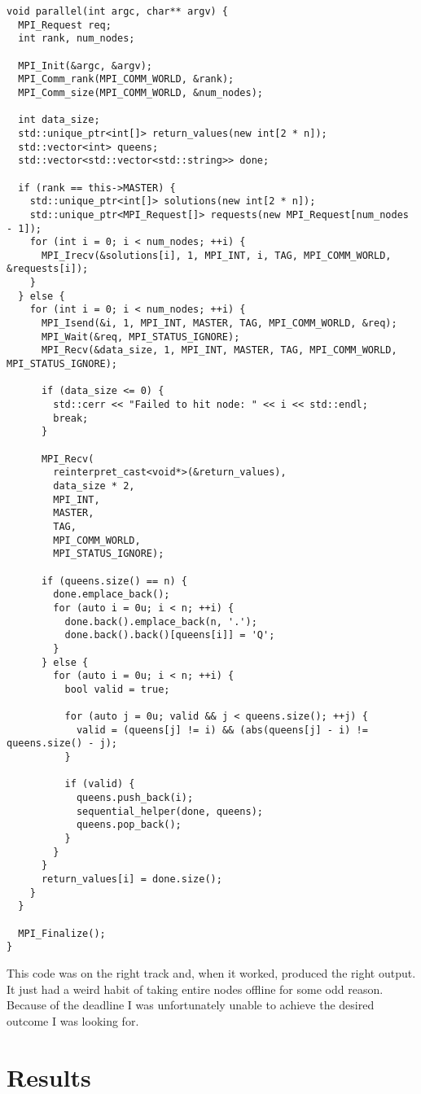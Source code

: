 \documentclass[11pt]{article}
\begin{document}
\lstset{frame=tb,language=c++}
\begin{lstlisting}
void parallel(int argc, char** argv) {
  MPI_Request req;
  int rank, num_nodes;

  MPI_Init(&argc, &argv);
  MPI_Comm_rank(MPI_COMM_WORLD, &rank);
  MPI_Comm_size(MPI_COMM_WORLD, &num_nodes);

  int data_size;
  std::unique_ptr<int[]> return_values(new int[2 * n]);
  std::vector<int> queens;
  std::vector<std::vector<std::string>> done;

  if (rank == this->MASTER) {
    std::unique_ptr<int[]> solutions(new int[2 * n]);
    std::unique_ptr<MPI_Request[]> requests(new MPI_Request[num_nodes - 1]);
    for (int i = 0; i < num_nodes; ++i) {
      MPI_Irecv(&solutions[i], 1, MPI_INT, i, TAG, MPI_COMM_WORLD, &requests[i]);
    }
  } else {
    for (int i = 0; i < num_nodes; ++i) {
      MPI_Isend(&i, 1, MPI_INT, MASTER, TAG, MPI_COMM_WORLD, &req);
      MPI_Wait(&req, MPI_STATUS_IGNORE);
      MPI_Recv(&data_size, 1, MPI_INT, MASTER, TAG, MPI_COMM_WORLD, MPI_STATUS_IGNORE);

      if (data_size <= 0) {
        std::cerr << "Failed to hit node: " << i << std::endl;
        break;
      }

      MPI_Recv(
        reinterpret_cast<void*>(&return_values),
        data_size * 2,
        MPI_INT,
        MASTER,
        TAG,
        MPI_COMM_WORLD,
        MPI_STATUS_IGNORE);

      if (queens.size() == n) {
        done.emplace_back();
        for (auto i = 0u; i < n; ++i) {
          done.back().emplace_back(n, '.');
          done.back().back()[queens[i]] = 'Q';
        }
      } else {
        for (auto i = 0u; i < n; ++i) {
          bool valid = true;

          for (auto j = 0u; valid && j < queens.size(); ++j) {
            valid = (queens[j] != i) && (abs(queens[j] - i) != queens.size() - j);
          }

          if (valid) {
            queens.push_back(i);
            sequential_helper(done, queens);
            queens.pop_back();
          }
        }
      }
      return_values[i] = done.size();
    }
  }

  MPI_Finalize();
}
\end{lstlisting}
This code was on the right track and, when it worked, produced the right output. It just had a weird habit of taking entire nodes offline for some odd reason. Because of the deadline I was unfortunately unable to achieve the desired outcome I was looking for.

\section{Results}
\end{document}
